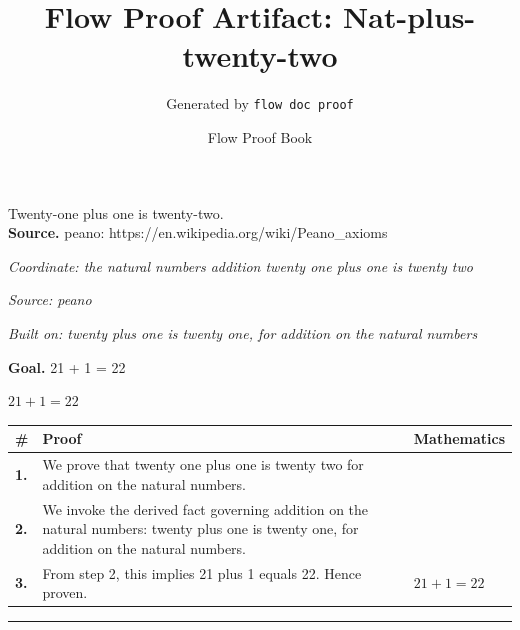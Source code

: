 \documentclass[11pt]{article}
\title{Flow Proof Artifact: Nat-plus-twenty-two}
\author{Generated by \texttt{flow doc proof}}
\date{Flow Proof Book}
\theoremstyle{definition}
\begin{document}
\maketitle
Twenty-one plus one is twenty-two.\\[0.5em]
\textbf{Source.} peano: https://en.wikipedia.org/wiki/Peano\_axioms\\[0.5em]
\bigskip
{}\par
\smallskip\noindent\textit{Coordinate: the natural numbers \cdot addition \cdot twenty one plus one is twenty two}\par
\smallskip\noindent\textit{Source: peano}\par
\smallskip\noindent\textit{Built on: twenty plus one is twenty one, for addition on the natural numbers}\par
\medskip
\noindent\textbf{Goal.} 21 + 1 = 22\par
\noindent$\displaystyle 21 + 1 = 22$\par
\medskip
\noindent
\begin{tabular}{@{} >{\raggedright\arraybackslash}p{} >{\raggedright\arraybackslash}p{} >{\raggedleft\arraybackslash}p{} @{}}
\textbf{\#} & \textbf{Proof} & \textbf{Mathematics} \\
\midrule
\textbf{1.} & We prove that twenty one plus one is twenty two for addition on the natural numbers. & \\[0.45em]
\textbf{2.} & We invoke the derived fact governing addition on the natural numbers: twenty plus one is twenty one, for addition on the natural numbers. & \\[0.45em]
\textbf{3.} & From step 2, this implies 21 plus 1 equals 22. Hence proven. & $\displaystyle 21 + 1 = 22$ \\[0.45em]
\bottomrule
\end{tabular}
\label{thm:Nat-addition-twenty_one_plus_one_is_twenty_two}
\par\medskip\hrule
\end{document}
